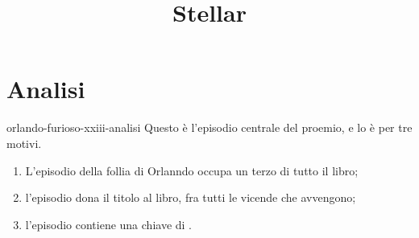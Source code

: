 \documentclass[preview]{standalone}
\begin{document}
\title{Stellar}
\genpage

\section{Analisi}

\begin{snippet}{orlando-furioso-xxiii-analisi}
    Questo è l'episodio centrale del proemio, e lo è per tre motivi.
    \begin{enumerate}
        \item L'episodio della follia di Orlanndo occupa un terzo di tutto il libro;
        \item l'episodio dona il titolo al libro, fra tutti le vicende che avvengono;
        \item l'episodio contiene una chiave di .
    \end{enumerate}


\end{snippet}
\end{document}
